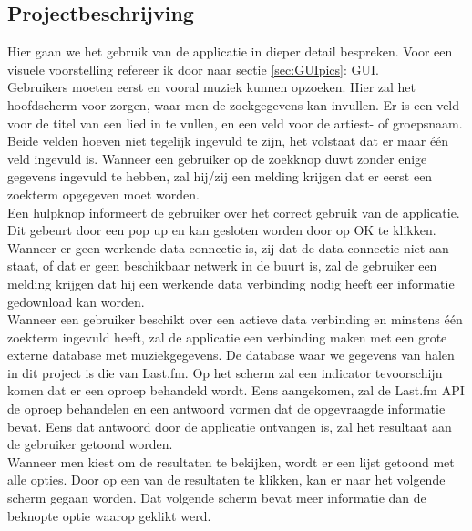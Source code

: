 \documentclass[11pt,a4paper]{article}
\begin{document}
	\subsection{Projectbeschrijving}
	\label{sec:Projectbeschrijving}
Hier gaan we het gebruik van de applicatie in dieper detail bespreken. Voor een visuele voorstelling refereer ik door naar sectie \ref{sec:GUIpics}: GUI.
\\
Gebruikers moeten eerst en vooral muziek kunnen opzoeken. Hier zal het hoofdscherm voor zorgen, waar men de zoekgegevens kan invullen. Er is een veld voor de titel van een lied in te vullen, en een veld voor de artiest- of groepsnaam. Beide velden hoeven niet tegelijk ingevuld te zijn, het volstaat dat er maar één veld ingevuld is. Wanneer een gebruiker op de zoekknop duwt zonder enige gegevens ingevuld te hebben, zal hij/zij een melding krijgen dat er eerst een zoekterm opgegeven moet worden.
\\ 

Een hulpknop informeert de gebruiker over het correct gebruik van de applicatie. Dit gebeurt door een pop up en kan gesloten worden door op OK te klikken. 
\\ 
 
Wanneer er geen werkende data connectie is, zij dat de data-connectie niet aan staat, of dat er geen beschikbaar netwerk in de buurt is, zal de gebruiker een melding krijgen dat hij een werkende data verbinding nodig heeft eer informatie gedownload kan worden. 
\\ 
	
Wanneer een gebruiker beschikt over een actieve data verbinding en minstens één zoekterm ingevuld heeft, zal de applicatie een verbinding maken met een grote externe database met muziekgegevens. De  database waar we gegevens van halen in dit project is die van Last.fm. Op het scherm zal een indicator tevoorschijn komen dat er een oproep behandeld wordt. Eens aangekomen, zal de Last.fm API de oproep behandelen en een antwoord vormen dat de opgevraagde informatie bevat. Eens dat antwoord door de applicatie ontvangen is, zal het resultaat aan de gebruiker getoond worden.
\\ 
	
Wanneer men kiest om de resultaten te bekijken, wordt er een lijst getoond met alle opties. Door op een van de resultaten te klikken, kan er naar het volgende scherm gegaan worden. Dat volgende scherm bevat meer informatie dan de beknopte optie waarop geklikt werd. 
\\ 
	
\end{document}
